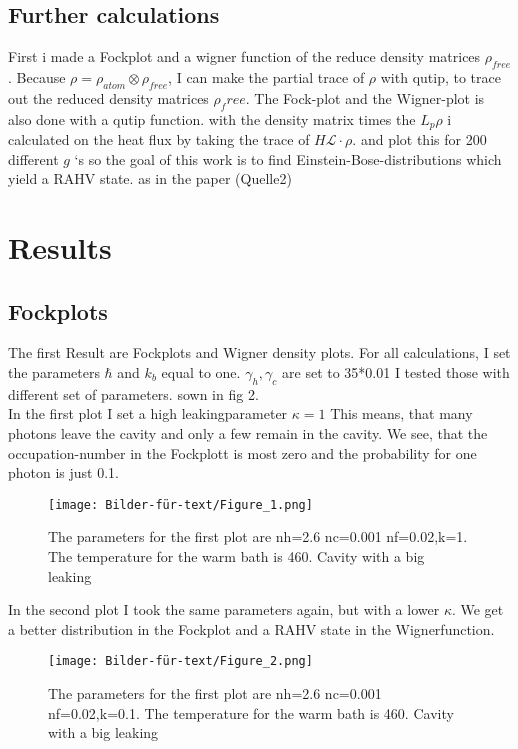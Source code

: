 \documentclass[12pt,a4paper]{article}
\begin{document}
\subsection{Further calculations}
First i made a Fockplot and a wigner function of the reduce density matrices $\rho_{free}$.
Because $\rho=\rho_{atom}\otimes \rho_{free}$, I can make the partial trace of $\rho$ with qutip, to trace out the reduced density matrices $\rho_free$. The Fock-plot and the Wigner-plot is also done with a qutip function.
with the density matrix times the $L_{p}\rho$ i calculated on the heat flux by taking the trace of $H \mathcal{L}\cdot \rho$. 
and plot this for 200 different  $g$ `s 
so the goal of this work is to find Einstein-Bose-distributions which yield a RAHV state.
as in the paper (Quelle2) 



\section{Results}
\subsection{Fockplots}
The first Result are Fockplots and Wigner density plots.
For all calculations, I set the parameters  $\hbar$ and $k_b$ equal to one. $\gamma_h, \gamma_c $ are set to 35*0.01
I tested those with different set of parameters. 
sown in fig 2.\\

In the first plot I set a high leakingparameter $\kappa=1$ 
This means, that many photons leave the cavity and only a few remain in the cavity. 
We see, that the occupation-number in the Fockplott is most zero and the probability for one photon is just 0.1.

\begin{figure}[h!]
\centering
\texttt{[image: Bilder-für-text/Figure\_1.png]}
\caption{The parameters for the first plot are nh=2.6 nc=0.001 nf=0.02,k=1. The temperature for the warm bath is 460. Cavity with a big leaking}
\end{figure}\newpage

In the second plot I took the same parameters again, but with a lower $\kappa$. We get a better distribution in the Fockplot and a RAHV state in the Wignerfunction. 

\begin{figure}[h!]
\centering
\texttt{[image: Bilder-für-text/Figure\_2.png]}
\caption{The parameters for the first plot are nh=2.6 nc=0.001 nf=0.02,k=0.1. The temperature for the warm bath is 460. Cavity with a big leaking}
\end{figure}
\end{document}
